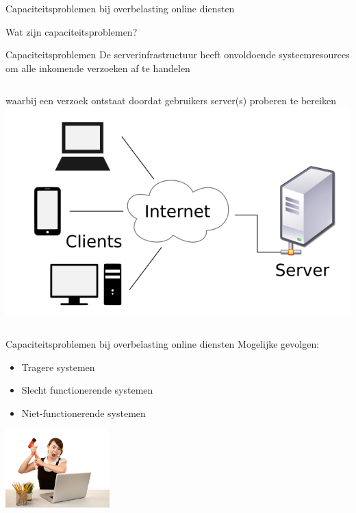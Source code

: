 \documentclass{beamer}
\begin{document}
\begin{frame}{Capaciteitsproblemen bij overbelasting online diensten}
    
    Wat zijn capaciteitsproblemen?
    
    \begin{alertblock}{Capaciteitsproblemen}
        De serverinfrastructuur heeft onvoldoende systeemresources
        om alle inkomende verzoeken af te handelen
    \end{alertblock}

    \begin{columns}
            waarbij een verzoek ontstaat doordat gebruikers server(s) proberen te bereiken
            \centering
            \includegraphics[width = \textwidth]{server-verzoeken.png}
    \end{columns} 

\end{frame}


\begin{frame}{Capaciteitsproblemen bij overbelasting online diensten}
    Mogelijke gevolgen:
    \begin{itemize}
        \item Tragere systemen
        \item Slecht functionerende systemen
        \item Niet-functionerende systemen
    \end{itemize}
    \begin{center}
        \includegraphics[height = 3cm]{destroy-computer.jpg}        
    \end{center}
\end{frame}
\end{document}
